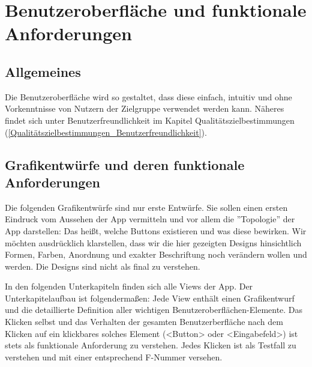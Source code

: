 \documentclass[oneside, ngerman]{sdqtechreport}
\begin{document}
\chapter{Benutzeroberfläche und funktionale Anforderungen}
\label{chap:Benutzeroberfläche}

\section{Allgemeines}
\label{sec:Benutzeroberfläche:Allgemeines}
Die Benutzeroberfläche wird so gestaltet, dass diese einfach, intuitiv und ohne Vorkenntnisse von Nutzern der Zielgruppe verwendet werden kann. Näheres findet sich unter Benutzerfreundlichkeit im Kapitel Qualitätszielbestimmungen (\ref{Qualitätszielbestimmungen_Benutzerfreundlichkeit}).


\section{Grafikentwürfe und deren funktionale Anforderungen}
\label{sec:Benutzeroberfläche:Grafiken}

Die folgenden Grafikentwürfe sind nur erste Entwürfe. Sie sollen einen ersten Eindruck vom Aussehen der App vermitteln und vor allem die ''Topologie'' der App darstellen: Das heißt, welche Buttons existieren und was diese bewirken. Wir möchten ausdrücklich klarstellen, dass wir die hier gezeigten Designs hinsichtlich Formen, Farben, Anordnung und exakter Beschriftung noch verändern wollen und werden. Die Designs sind nicht als final zu verstehen.

In den folgenden Unterkapiteln finden sich alle Views der App. Der Unterkapitelaufbau ist folgendermaßen: Jede View enthält einen Grafikentwurf und die detaillierte Definition aller wichtigen Benutzeroberflächen-Elemente. Das Klicken selbst und das Verhalten der gesamten Benutzerberfläche nach dem Klicken auf ein klickbares solches Element (<Button> oder <Eingabefeld>) ist stets als funktionale Anforderung zu verstehen. Jedes Klicken ist als Testfall zu verstehen und mit einer entsprechend F-Nummer versehen.
\vspace{\baselineskip} \\
\end{document}
